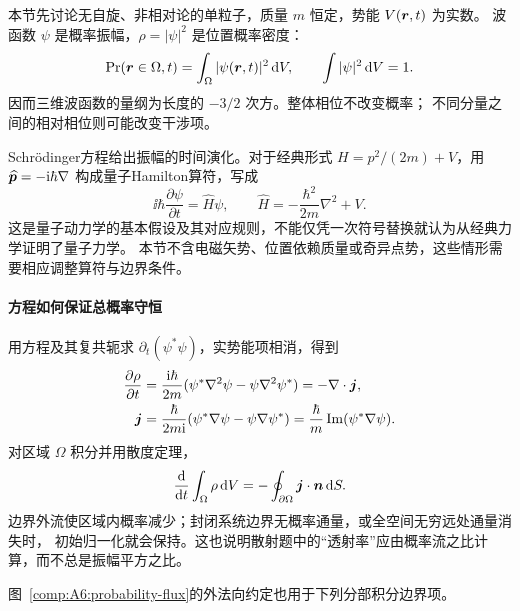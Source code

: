 本节先讨论无自旋、非相对论的单粒子，质量 $m$ 恒定，势能 $V(\bm{r},t)$ 为实数。
波函数 $\psi$ 是概率振幅，$\rho=|\psi|^2$ 是位置概率密度：
\[
 \Pr(\bm{r}\in\Omega,t)=\int_\Omega|\psi(\bm{r},t)|^2\mathop{}\!\mathrm d V,
 \qquad \int|\psi|^2\mathop{}\!\mathrm d V=1.
\]
因而三维波函数的量纲为长度的 $-3/2$ 次方。整体相位不改变概率；
不同分量之间的相对相位则可能改变干涉项。

Schrödinger方程给出振幅的时间演化。对于经典形式
$H=p^2/(2m)+V$，用 $\widehat{\bm{p}}=-\mathrm i\hbar\nabla$ 构成量子Hamilton算符，写成
\[
 \ii\hbar\frac{\partial\psi}{\partial t}
 =\widehat H\psi,
 \qquad \widehat H=-\frac{\hbar^2}{2m}\nabla^2+V.
\]
这是量子动力学的基本假设及其对应规则，不能仅凭一次符号替换就认为从经典力学证明了量子力学。
本节不含电磁矢势、位置依赖质量或奇异点势，这些情形需要相应调整算符与边界条件。

\paragraph{方程如何保证总概率守恒}
用方程及其复共轭求 $\partial_t(\psi^*\psi)$，实势能项相消，得到
\[
 \begin{aligned}
 \frac{\partial\rho}{\partial t}
 &=\frac{\mathrm i\hbar}{2m}
  (\psi^*\nabla^2\psi-\psi\nabla^2\psi^*)
 =-\nabla\cdot\bm{j},\\
 \bm{j}&=\frac{\hbar}{2m\mathrm i}
 (\psi^*\nabla\psi-\psi\nabla\psi^*)
 =\frac{\hbar}{m}\operatorname{Im}(\psi^*\nabla\psi).
 \end{aligned}
\]
对区域 $\Omega$ 积分并用散度定理，
\[
 \frac{\mathop{}\!\mathrm d}{\mathop{}\!\mathrm d t}\int_\Omega\rho\mathop{}\!\mathrm d V
 =-\oint_{\partial\Omega}\bm{j}\cdot\bm{n}\mathop{}\!\mathrm d S.
\]
边界外流使区域内概率减少；封闭系统边界无概率通量，或全空间无穷远处通量消失时，
初始归一化就会保持。这也说明散射题中的“透射率”应由概率流之比计算，而不总是振幅平方之比。

\begin{center}\begin{minipage}{.94\linewidth}\centering
{}
\label{comp:A6:probability-flux}
\end{minipage}\end{center}
图~\ref{comp:A6:probability-flux}的外法向约定也用于下列分部积分边界项。

